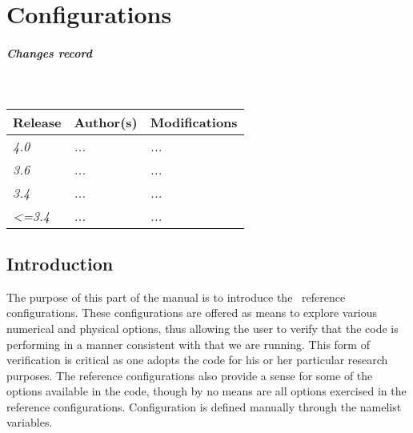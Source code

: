\documentclass[../main/NEMO_manual]{subfiles}
\begin{document}
\chapter{Configurations}
\label{chap:CFGS}

\thispagestyle{plain}

\chaptertoc

\paragraph{Changes record} ~\\

{\footnotesize
  \begin{tabularx}{\textwidth}{l||X|X}
    Release & Author(s) & Modifications \\
    \hline
    {\em   4.0} & {\em ...} & {\em ...} \\
    {\em   3.6} & {\em ...} & {\em ...} \\
    {\em   3.4} & {\em ...} & {\em ...} \\
    {\em <=3.4} & {\em ...} & {\em ...}
  \end{tabularx}
}

\clearpage

\section{Introduction}
\label{sec:CFGS_intro}

The purpose of this part of the manual is to introduce the \NEMO\ reference configurations.
These configurations are offered as means to explore various numerical and physical options,
thus allowing the user to verify that the code is performing in a manner consistent with that we are running.
This form of verification is critical as one adopts the code for his or her particular research purposes.
The reference configurations also provide a sense for some of the options available in the code,
though by no means are all options exercised in the reference configurations.
Configuration is defined manually through the  namelist variables.

\begin{listing}
  \caption{}
  \label{lst:namcfg}
\end{listing}

\end{document}
